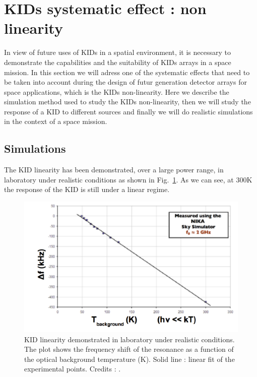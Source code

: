 
\section{KIDs systematic effect : non linearity}
\label{sec:KID-systematics}

In view of future uses of KIDs in a spatial environment, it is necessary to demonstrate the capabilities and the suitability of KIDs arrays in a space mission. In this section we will adress one of the systematic effects that need to be taken into account during the design of futur generation detector arrays for space applications, which is the KIDs non-linearity. Here we describe the simulation method used to study the KIDs non-linearity, then we will study the response of a KID to different sources and finally we will do realistic simulations in the context of a space mission.

\subsection{Simulations}

The KID linearity has been demonstrated, over a large power range, in laboratory under realistic conditions as shown in Fig.~\ref{KID-lin}. As we can see, at 300K the response of the KID is still under a linear regime.

\begin{figure}[h]
\center
	\includegraphics[scale=0.55]{Figures/KID-linearity-Monfardini2014.png}
	\caption{KID linearity demonstrated in laboratory under realistic conditions. The plot shows the frequency shift of the resonance as a function of the optical background temperature (K). Solid line : linear fit of the experimental points. Credits : \citet{2014JLTP..176..787M}.}
	\label{KID-lin}
\end{figure}

